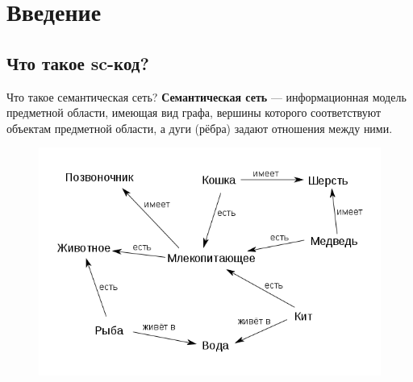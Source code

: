 % 
% 
%
% 
% 

\section{Введение}

\subsection{Что такое sc-код?}

\begin{frame}{Что такое семантическая сеть?}
  \textbf{Семантическая сеть} — информационная модель предметной
  области, имеющая вид графа, вершины которого соответствуют объектам
  предметной области, а дуги (рёбра) задают отношения между ними.
  \begin{figure}
    \centering
    \includegraphics[scale=0.5]{intro/Semantic_net_example}
  \end{figure}
\end{frame}


